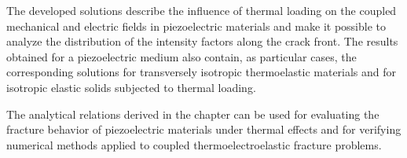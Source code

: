 The developed solutions describe the influence of thermal loading on the coupled mechanical and electric fields in piezoelectric materials and make it possible to analyze the distribution of the intensity factors along the crack front. The results obtained for a piezoelectric medium also contain, as particular cases, the corresponding solutions for transversely isotropic thermoelastic materials and for isotropic elastic solids subjected to thermal loading.

The analytical relations derived in the chapter can be used for evaluating the fracture behavior of piezoelectric materials under thermal effects and for verifying numerical methods applied to coupled thermoelectroelastic fracture problems.



